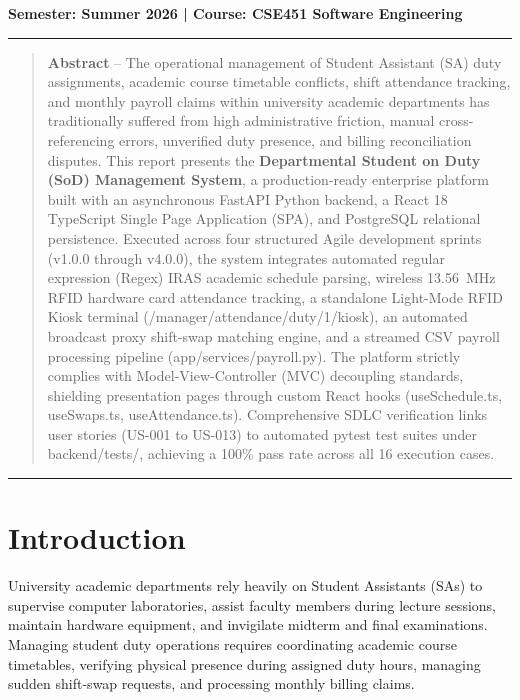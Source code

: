 \documentclass[10pt,a4paper,twocolumn,fleqn]{article}
\newcommand{\myurl}[1]{{\small #1}}
\begin{document}
\begin{center}
    \vspace{0.8cm}
    \color{AccentSlate}\textbf{Semester: Summer 2026 \quad | \quad Course: CSE451 Software Engineering} \\
    \vspace{0.4cm}
    \hrule
    \vspace{0.6cm}
\end{center}

\begin{quotation}
  \noindent \textbf{\color{PrimaryNavy}\Large Abstract} -- The operational management of Student Assistant (SA) duty assignments, academic course timetable conflicts, shift attendance tracking, and monthly payroll claims within university academic departments has traditionally suffered from high administrative friction, manual cross-referencing errors, unverified duty presence, and billing reconciliation disputes. This report presents the \textbf{Departmental Student on Duty (SoD) Management System}, a production-ready enterprise platform built with an asynchronous FastAPI Python backend, a React 18 TypeScript Single Page Application (SPA), and PostgreSQL relational persistence. Executed across four structured Agile development sprints (v1.0.0 through v4.0.0), the system integrates automated regular expression (Regex) IRAS academic schedule parsing, wireless 13.56~MHz RFID hardware card attendance tracking, a standalone Light-Mode RFID Kiosk terminal (\myurl{/manager/attendance/duty/1/kiosk}), an automated broadcast proxy shift-swap matching engine, and a streamed CSV payroll processing pipeline (app/services/payroll.py). The platform strictly complies with Model-View-Controller (MVC) decoupling standards, shielding presentation pages through custom React hooks (useSchedule.ts, useSwaps.ts, useAttendance.ts). Comprehensive SDLC verification links user stories (US-001 to US-013) to automated pytest test suites under backend/tests/, achieving a 100\% pass rate across all 16 execution cases.
\end{quotation}

\vspace{0.8cm}
\hrule
\vspace{0.8cm}

\twocolumn

\section{Introduction}
University academic departments rely heavily on Student Assistants (SAs) to supervise computer laboratories, assist faculty members during lecture sessions, maintain hardware equipment, and invigilate midterm and final examinations. Managing student duty operations requires coordinating academic course timetables, verifying physical presence during assigned duty hours, managing sudden shift-swap requests, and processing monthly billing claims.
\end{document}
